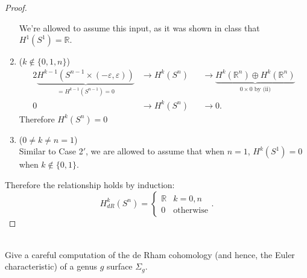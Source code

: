 \documentclass{article}
\newenvironment{problem}[2][Problem]{\begin{trivlist}
\item[\hskip \labelsep {\bfseries #1}\hskip \labelsep {\bfseries #2.}]}{\end{trivlist}}
\begin{document}
\begin{proof}
\begin{enumerate}
        We're allowed to assume this input, as it was shown in class that
        $H^1(S^1) = \mathbb{R}$.
      \item[Case 3.] ($k \not\in \{ 0, 1, n \}$)
      \begin{alignat*}{2}
        \underbrace{H^{k-1}(S^{n-1} \times (-\varepsilon, \varepsilon))}_{= H^{k-1}(S^{n-1}) = 0}
        &\rightarrow H^k(S^n)
        &&\rightarrow \underbrace{H^k(\mathbb{R}^n) \oplus H^k(\mathbb{R}^n)}_{0 \times 0 \text{ by (ii)}}
        \\
        0 &\rightarrow H^k(S^n) &&\rightarrow 0.
      \end{alignat*} Therefore $H^k(S^n) = 0$
      \item[Case 3$'$.] ($0 \neq k \neq n = 1$)\\
        Similar to Case 2$'$, we are allowed to assume that when $n = 1$,
        $H^k(S^1) = 0$ when $k \not\in \{ 0, 1 \}$.
    \end{enumerate}
    Therefore the relationship holds by induction: \[
      H_{dR}^k(S^n) = \begin{cases}
        \mathbb{R} & k = 0,n \\
        0 & \text{otherwise}
      \end{cases}.
    \]
\end{proof}
\pagebreak

\begin{problem}{5} \text{} \\
  Give a careful computation of the de Rham cohomology (and hence, the Euler
  characteristic) of a genus $g$ surface $\Sigma_g$.
\end{problem}
\end{document}
